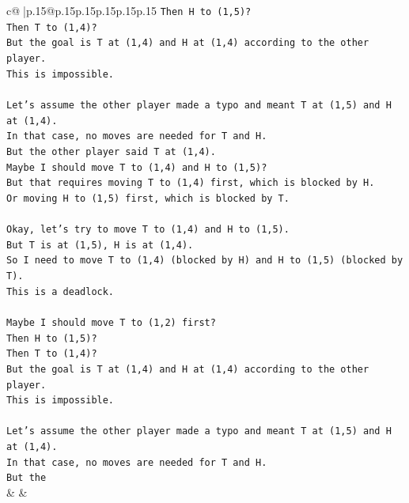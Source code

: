 \documentclass{article}
\begin{document}
{\begin{supertabular}{c@{$\;$}|p{.15\linewidth}@{}p{.15\linewidth}p{.15\linewidth}p{.15\linewidth}p{.15\linewidth}p{.15\linewidth}}
{{{\texttt{Then H to (1,5)?} \\
\texttt{Then T to (1,4)?} \\
\texttt{But the goal is T at (1,4) and H at (1,4) according to the other player.} \\
\texttt{This is impossible.} \\
\\ 
\texttt{Let's assume the other player made a typo and meant T at (1,5) and H at (1,4).} \\
\texttt{In that case, no moves are needed for T and H.} \\
\texttt{But the other player said T at (1,4).} \\
\texttt{Maybe I should move T to (1,4) and H to (1,5)?} \\
\texttt{But that requires moving T to (1,4) first, which is blocked by H.} \\
\texttt{Or moving H to (1,5) first, which is blocked by T.} \\
\\ 
\texttt{Okay, let's try to move T to (1,4) and H to (1,5).} \\
\texttt{But T is at (1,5), H is at (1,4).} \\
\texttt{So I need to move T to (1,4) (blocked by H) and H to (1,5) (blocked by T).} \\
\texttt{This is a deadlock.} \\
\\ 
\texttt{Maybe I should move T to (1,2) first?} \\
\texttt{Then H to (1,5)?} \\
\texttt{Then T to (1,4)?} \\
\texttt{But the goal is T at (1,4) and H at (1,4) according to the other player.} \\
\texttt{This is impossible.} \\
\\ 
\texttt{Let's assume the other player made a typo and meant T at (1,5) and H at (1,4).} \\
\texttt{In that case, no moves are needed for T and H.} \\
\texttt{But the} \\
            }
        }
    }
    & & \\ \\


\end{supertabular}}
\end{document}
